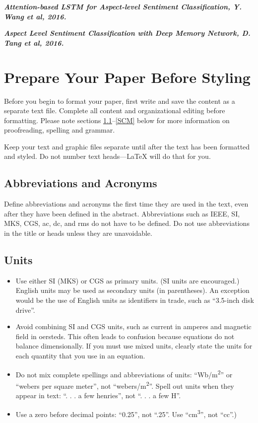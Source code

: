 \documentclass[conference]{IEEEtran}
\begin{document}
\textit{\textbf{Attention-based LSTM for Aspect-level Sentiment Classification, Y. Wang et al, 2016.}}



\textit{\textbf{Aspect Level Sentiment Classification with Deep Memory Network, D. Tang et al, 2016.}}

\section{Prepare Your Paper Before Styling}
Before you begin to format your paper, first write and save the content as a 
separate text file. Complete all content and organizational editing before 
formatting. Please note sections \ref{AA}--\ref{SCM} below for more information on 
proofreading, spelling and grammar.

Keep your text and graphic files separate until after the text has been 
formatted and styled. Do not number text heads---{\LaTeX} will do that 
for you.

\subsection{Abbreviations and Acronyms}\label{AA}
Define abbreviations and acronyms the first time they are used in the text, 
even after they have been defined in the abstract. Abbreviations such as 
IEEE, SI, MKS, CGS, ac, dc, and rms do not have to be defined. Do not use 
abbreviations in the title or heads unless they are unavoidable.

\subsection{Units}
\begin{itemize}
\item Use either SI (MKS) or CGS as primary units. (SI units are encouraged.) English units may be used as secondary units (in parentheses). An exception would be the use of English units as identifiers in trade, such as ``3.5-inch disk drive''.
\item Avoid combining SI and CGS units, such as current in amperes and magnetic field in oersteds. This often leads to confusion because equations do not balance dimensionally. If you must use mixed units, clearly state the units for each quantity that you use in an equation.
\item Do not mix complete spellings and abbreviations of units: ``Wb/m\textsuperscript{2}'' or ``webers per square meter'', not ``webers/m\textsuperscript{2}''. Spell out units when they appear in text: ``. . . a few henries'', not ``. . . a few H''.
\item Use a zero before decimal points: ``0.25'', not ``.25''. Use ``cm\textsuperscript{3}'', not ``cc''.)
\end{itemize}
\end{document}
